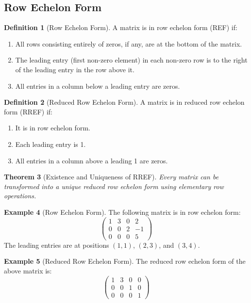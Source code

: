 \documentclass[12pt,a4paper]{article}
\theoremstyle{plain}
\newtheorem{theorem}{Theorem}[section]
\theoremstyle{definition}
\newtheorem{definition}[theorem]{Definition}
\newtheorem{example}[theorem]{Example}
\begin{document}
\subsection{Row Echelon Form}

\begin{definition}[Row Echelon Form]
A matrix is in row echelon form (REF) if:
\begin{enumerate}[label=(\roman*)]
\item All rows consisting entirely of zeros, if any, are at the bottom of the matrix.
\item The leading entry (first non-zero element) in each non-zero row is to the right of the leading entry in the row above it.
\item All entries in a column below a leading entry are zeros.
\end{enumerate}
\end{definition}

\begin{definition}[Reduced Row Echelon Form]
A matrix is in reduced row echelon form (RREF) if:
\begin{enumerate}[label=(\roman*)]
\item It is in row echelon form.
\item Each leading entry is 1.
\item All entries in a column above a leading 1 are zeros.
\end{enumerate}
\end{definition}

\begin{theorem}[Existence and Uniqueness of RREF]
Every matrix can be transformed into a unique reduced row echelon form using elementary row operations.
\end{theorem}

\begin{example}[Row Echelon Form]
The following matrix is in row echelon form:
\begin{equation}
\begin{pmatrix}
1 & 3 & 0 & 2 \\
0 & 0 & 2 & -1 \\
0 & 0 & 0 & 5
\end{pmatrix}
\end{equation}
The leading entries are at positions $(1,1)$, $(2,3)$, and $(3,4)$.
\end{example}

\begin{example}[Reduced Row Echelon Form]
The reduced row echelon form of the above matrix is:
\begin{equation}
\begin{pmatrix}
1 & 3 & 0 & 0 \\
0 & 0 & 1 & 0 \\
0 & 0 & 0 & 1
\end{pmatrix}
\end{equation}
\end{example}
\end{document}
